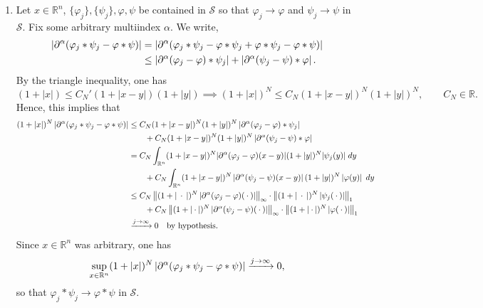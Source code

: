 \documentclass{article}
\begin{document}
\begin{itemize}
	{\color{orange}
		\begin{enumerate}[itemsep =-2pt,label = (\arabic{*})]
			\item Let $x \in \mathbb{R}^{n}$, $\{\varphi_{j}\}, \{\psi_{j}\}, \varphi, \psi$ be contained in $\mathcal{S}$ so that $\varphi_{j} \to \varphi$ and $\psi_{j} \to \psi$ in $\mathcal{S}$. Fix some arbitrary multiindex $\alpha$. We write, 
			\begin{align}
				\begin{split}
					\left| \partial^{\alpha}(\varphi_{j} \ast \psi_{j} - \varphi \ast \psi) \right| &= \left| \partial^{\alpha}(\varphi_{j} \ast \psi_{j} - \varphi \ast \psi_{j} + \varphi \ast \psi_{j} - \varphi \ast \psi) \right| \\
					&\leq \left| \partial^{\alpha}(\varphi_{j} - \varphi) \ast \psi_{j} \right| + \left| \partial^{\alpha}(\psi_{j} - \psi) \ast \varphi \right|. 
				\end{split}
			\end{align}
			By the triangle inequality, one has 
			\begin{equation}
				(1 + |x|) \leq C_{N}'(1 + |x - y|)(1 + |y|) \implies (1 + |x|)^{N} \leq C_{N}(1 + |x - y|)^{N}(1 + |y|)^{N}, \qquad C_{N} \in \mathbb{R}. 
			\end{equation}
			Hence, this implies that 
			\begin{align}
				\begin{split}
					(1 + |x|)^{N}\left| \partial^{\alpha}(\varphi_{j} \ast \psi_{j} - \varphi \ast \psi) \right| &\leq C_{N} (1 + |x - y|)^{N}(1 + |y|)^{N} \left| \partial^{\alpha}(\varphi_{j} - \varphi) \ast \psi_{j} \right|\\
					&\qquad + C_{N}(1 + |x - y|)^{N}(1 + |y|)^{N}\left| \partial^{\alpha}(\psi_{j} - \psi)\ast \varphi \right| \\
					&= C_{N}\int_{\mathbb{R}^{n}}(1 + |x - y|)^{N}|\partial^{\alpha}(\varphi_{j} - \varphi)(x - y)|(1 + |y|)^{N}|\psi_{j}(y)|\;dy \\
					&\qquad + C_{N}\int_{\mathbb{R}^{n}}(1 + |x-y|)^{N}\left| \partial^{\alpha}(\psi_{j} - \psi)(x-y) \right|(1 + |y|)^{N}\left| \varphi(y) \right|\;dy \\
					&\leq C_{N}\left\Vert (1 + |\hspace{2pt}\cdot\hspace{2pt}|)^{N}\left| \partial^{\alpha}(\varphi_{j} - \varphi)(\hspace{2pt}\cdot\hspace{2pt}) \right| \right\Vert_{\infty}\cdot \left\Vert (1 + |\hspace{2pt}\cdot\hspace{2pt}|)^{N}\left| \psi_{j}(\hspace{2pt}\cdot\hspace{2pt}) \right| \right\Vert_{1}\\
					&\qquad + C_{N}\left\Vert (1 + \left| \hspace{2pt}\cdot\hspace{2pt} \right|)^{N}\left| \partial^{\alpha}(\psi_{j} - \psi)(\hspace{2pt}\cdot\hspace{2pt}) \right| \right\Vert_{\infty}\cdot \left\Vert (1 + \left| \hspace{2pt}\cdot\hspace{2pt} \right|)^{N}\left| \varphi(\hspace{2pt}\cdot\hspace{2pt}) \right| \right\Vert_{1}\\
					&\xrightarrow{j \to \infty} 0 \quad \text{by hypothesis}. 
				\end{split}
			\end{align}
			Since $x \in \mathbb{R}^{n}$ was arbitrary, one has 
			\begin{equation}
				\sup_{x \in \mathbb{R}^{n}}(1 + |x|)^{N}\left| \partial^{\alpha}(\varphi_{j} \ast \psi_{j} - \varphi \ast \psi) \right| \xrightarrow{j \to \infty} 0, 
			\end{equation}
			so that $\varphi_{j} \ast \psi_{j} \to \varphi \ast \psi$ in $\mathcal{S}$. 
			

\end{enumerate}}
\end{itemize}
\end{document}
